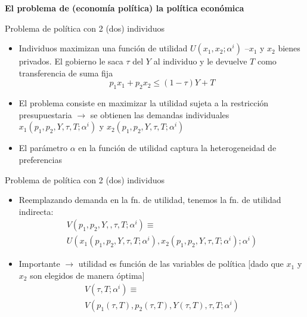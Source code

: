 \documentclass[
  ignorenonframetext,
]{beamer}
\providecommand{\tightlist}{%
  \setlength{\itemsep}{0pt}\setlength{\parskip}{0pt}}\usepackage{longtable,booktabs,array}
\begin{document}
\begin{frame}{\textbf{El problema de (economía política) la política
económica}}
\begin{block}{Problema de política con 2 (dos) individuos}
\protect\hypertarget{problema-de-poluxedtica-con-2-dos-individuos}{}
\begin{itemize}
\tightlist
\item
  Individuos maximizan una función de utilidad
  \(U(x_{1},x_{2};\alpha^{i})\) --\(x_{1}\) y \(x_{2}\) bienes privados.
  El gobierno le saca \(\tau\) del \(Y\) al individuo y le devuelve
  \(T\) como transferencia de suma fija
  \[p_{1}x_{1}+p_{2}x_{2} \leq (1-\tau)Y+T\]
\item
  El problema consiste en maximizar la utilidad sujeta a la restricción
  presupuestaria \(\longrightarrow\) se obtienen las demandas
  individuales \(x_{1}(p_{1},p_{2},Y,\tau,T;\alpha^{i})\) y
  \(x_{2}(p_{1},p_{2},Y,\tau,T;\alpha^{i})\)
\item
  El parámetro \(\alpha\) en la función de utilidad captura la
  heterogeneidad de preferencias
\end{itemize}
\end{block}

\begin{block}{Problema de política con 2 (dos) individuos}
\protect\hypertarget{problema-de-poluxedtica-con-2-dos-individuos-1}{}
\begin{itemize}
\tightlist
\item
  Reemplazando demanda en la fn. de utilidad, tenemos la fn. de utilidad
  indirecta: \[\begin{aligned}
            V(p_{1},p_{2},Y,,\tau,T;\alpha^{i}) \equiv \\
            U(x_{1}(p_{1},p_{2},Y,\tau,T;\alpha^{i}),x_{2}(p_{1},p_{2},Y,\tau,T;\alpha^{i});\alpha^{i})
          \end{aligned}\]
\item
  Importante \(\longrightarrow\) utilidad es función de las variables de
  política {[}dado que \(x_{1}\) y \(x_{2}\) son elegidos de manera
  óptima{]} \[\begin{aligned}
    V(\tau,T;\alpha^{i}) \equiv \\ V(p_{1}(\tau,T),p_{2}(\tau,T),Y(\tau,T),\tau,T;\alpha^{i})
              \end{aligned}\]
\end{itemize}
\end{block}


\end{frame}
\end{document}
